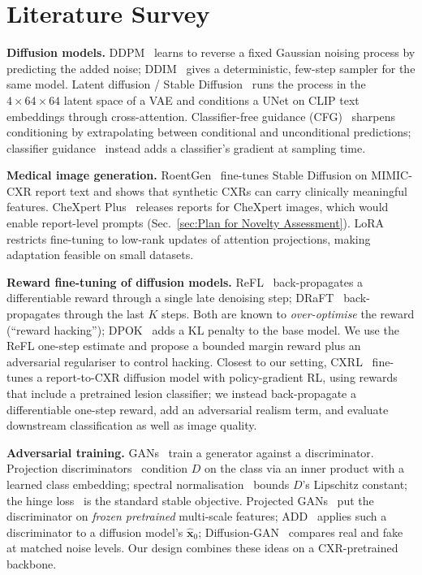 \documentclass[twoside,english]{article}
\newcommand{\hx}{\hat{\mathbf{x}}_0}
\begin{document}
\section{Literature Survey}\label{sec:litsurvey}
\textbf{Diffusion models.} DDPM~\citep{ho2020ddpm} learns to reverse a fixed Gaussian noising process by predicting the added noise; DDIM~\citep{song2021ddim} gives a deterministic, few-step sampler for the same model. Latent diffusion / Stable Diffusion~\citep{rombach2022ldm} runs the process in the $4\times64\times64$ latent space of a VAE and conditions a UNet on CLIP text embeddings through cross-attention. Classifier-free guidance (CFG)~\citep{ho2022cfg} sharpens conditioning by extrapolating between conditional and unconditional predictions; classifier guidance~\citep{dhariwal2021guidance} instead adds a classifier's gradient at sampling time.

\textbf{Medical image generation.} RoentGen~\citep{chambon2022roentgen} fine-tunes Stable Diffusion on MIMIC-CXR report text and shows that synthetic CXRs can carry clinically meaningful features. CheXpert Plus~\citep{chambon2024chexpertplus} releases reports for CheXpert images, which would enable report-level prompts (Sec.~\ref{sec:Plan for Novelty Assessment}). LoRA~\citep{hu2022lora} restricts fine-tuning to low-rank updates of attention projections, making adaptation feasible on small datasets.

\textbf{Reward fine-tuning of diffusion models.} ReFL~\citep{xu2023imagereward} back-propagates a differentiable reward through a single late denoising step; DRaFT~\citep{clark2024draft} back-propagates through the last $K$ steps. Both are known to \emph{over-optimise} the reward (``reward hacking''); DPOK~\citep{fan2023dpok} adds a KL penalty to the base model. We use the ReFL one-step estimate and propose a bounded margin reward plus an adversarial regulariser to control hacking. Closest to our setting, CXRL~\citep{han2024cxrl} fine-tunes a report-to-CXR diffusion model with policy-gradient RL, using rewards that include a pretrained lesion classifier; we instead back-propagate a differentiable one-step reward, add an adversarial realism term, and evaluate downstream classification as well as image quality.

\textbf{Adversarial training.} GANs~\citep{goodfellow2014gan} train a generator against a discriminator. Projection discriminators~\citep{miyato2018projection} condition $D$ on the class via an inner product with a learned class embedding; spectral normalisation~\citep{miyato2018sn} bounds $D$'s Lipschitz constant; the hinge loss~\citep{lim2017geometric} is the standard stable objective. Projected GANs~\citep{sauer2021projected} put the discriminator on \emph{frozen pretrained} multi-scale features; ADD~\citep{sauer2023add} applies such a discriminator to a diffusion model's $\hx$; Diffusion-GAN~\citep{wang2023diffusiongan} compares real and fake at matched noise levels. Our design combines these ideas on a CXR-pretrained backbone.
\end{document}
